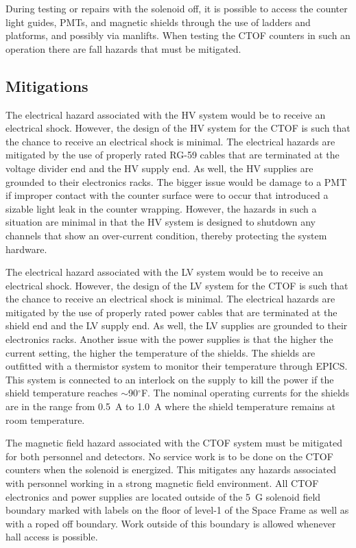 During testing or repairs with the solenoid off, it is possible to access the counter light guides,
PMTs, and magnetic shields through the use of ladders and platforms, and possibly via manlifts. When
testing the CTOF counters in such an operation there are fall hazards that must be mitigated.

\subsection{Mitigations}

The electrical hazard associated with the HV system would be to receive an electrical shock. 
However, the design of the HV system for the CTOF is such that the chance to receive an 
electrical shock is minimal. The electrical hazards are mitigated by the use of properly
rated RG-59 cables that are terminated at the voltage divider end and the HV supply end. As 
well, the HV supplies are grounded to their electronics racks. The bigger issue would be 
damage to a PMT if improper contact with the counter surface were to occur that introduced 
a sizable light leak in the counter wrapping. However, the hazards in such a situation are 
minimal in that the HV system is designed to shutdown any channels that show an over-current
condition, thereby protecting the system hardware.

The electrical hazard associated with the LV system would be to receive an electrical shock. 
However, the design of the LV system for the CTOF is such that the chance to receive an 
electrical shock is minimal. The electrical hazards are mitigated by the use of properly
rated power cables that are terminated at the shield end and the LV supply end. As well, 
the LV supplies are grounded to their electronics racks. Another issue with the power 
supplies is that the higher the current setting, the higher the temperature of the shields. 
The shields are outfitted with a thermistor system to monitor their temperature through 
EPICS. This system is connected to an interlock on the supply to kill the power if the 
shield temperature reaches $\sim$90$^\circ$F. The nominal operating currents for the shields 
are in the range from 0.5~A to 1.0~A where the shield temperature remains at room temperature.

The magnetic field hazard associated with the CTOF system must be mitigated for both personnel
and detectors. No service work is to be done on the CTOF counters when the solenoid is energized.
This mitigates any hazards associated with personnel working in a strong magnetic field environment.
All CTOF electronics and power supplies are located outside of the 5~G solenoid field boundary
marked with labels on the floor of level-1 of the Space Frame as well as with a roped off
boundary. Work outside of this boundary is allowed whenever hall access is possible.

